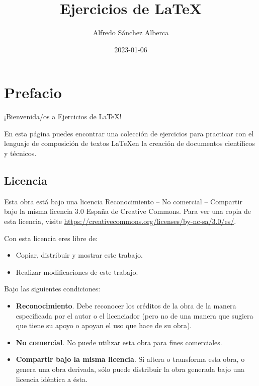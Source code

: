 \documentclass[
  a4paper,
]{scrreport}
\title{Ejercicios de LaTeX}
\author{Alfredo Sánchez Alberca}
\date{2023-01-06}
\providecommand{\tightlist}{%
  \setlength{\itemsep}{0pt}\setlength{\parskip}{0pt}}\usepackage{longtable,booktabs,array}
\renewcommand*\contentsname{Tabla de contenidos}
\newcommand\contentsname{Tabla de contenidos}
\theoremstyle{definition}
\theoremstyle{remark}
\begin{document}
\maketitle
\ifdefined\Shaded\renewenvironment{Shaded}{\begin{tcolorbox}[interior hidden, breakable, enhanced, sharp corners, boxrule=0pt, frame hidden, borderline west={3pt}{0pt}{shadecolor}]}{\end{tcolorbox}}\fi

\renewcommand*\contentsname{Tabla de contenidos}
{
\hypersetup{linkcolor=}
\setcounter{tocdepth}{2}
\tableofcontents
}

\hypertarget{prefacio}{%
\chapter*{Prefacio}\label{prefacio}}


¡Bienvenida/os a Ejercicios de \LaTeX!

En esta página puedes encontrar una colección de ejercicios para
practicar con el lenguaje de composición de textos \LaTeX en la
creación de documentos científicos y técnicos.

\hypertarget{licencia}{%
\section*{Licencia}\label{licencia}}


Esta obra está bajo una licencia Reconocimiento -- No comercial --
Compartir bajo la misma licencia 3.0 España de Creative Commons. Para
ver una copia de esta licencia, visite
\url{https://creativecommons.org/licenses/by-nc-sa/3.0/es/}.

Con esta licencia eres libre de:

\begin{itemize}
\tightlist
\item
  Copiar, distribuir y mostrar este trabajo.
\item
  Realizar modificaciones de este trabajo.
\end{itemize}

Bajo las siguientes condiciones:

\begin{itemize}
\item
  \textbf{Reconocimiento}. Debe reconocer los créditos de la obra de la
  manera especificada por el autor o el licenciador (pero no de una
  manera que sugiera que tiene su apoyo o apoyan el uso que hace de su
  obra).
\item
  \textbf{No comercial}. No puede utilizar esta obra para fines
  comerciales.
\item
  \textbf{Compartir bajo la misma licencia}. Si altera o transforma esta
  obra, o genera una obra derivada, sólo puede distribuir la obra
  generada bajo una licencia idéntica a ésta.
\end{itemize}
\end{document}
